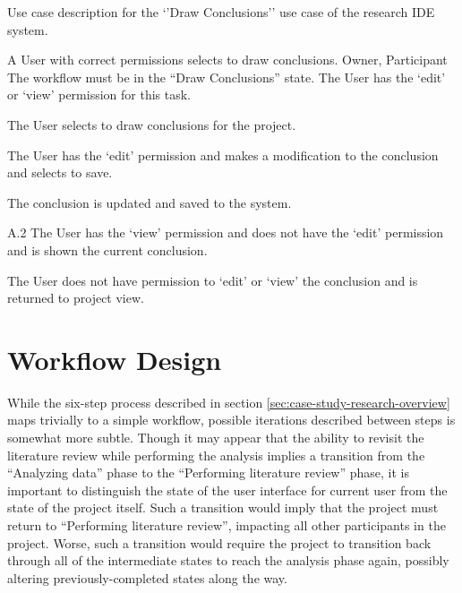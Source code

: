 \begin{table}
  \centering
  \caption{Use case description for the `'Draw Conclusions'' use case of the research IDE system.}
  \label{tbl:use-case-draw-conclusions}

  \begin{usecase}
    A User with correct permissions selects to draw conclusions.
    Owner, Participant
    The workflow must be in the “Draw Conclusions” state. The User has the ‘edit’ or ‘view’ permission for this task.
    \ucnormal
    \begin{ucenum}
      \item The User selects to draw conclusions for the project.
      \item The User has the ‘edit’ permission and makes a modification to the conclusion and selects to save.
      \item The conclusion is updated and saved to the system.
    \end{ucenum}
    \begin{ucenum}
      \item [A.2] The User has the ‘view’ permission and does not have the ‘edit’ permission and is shown the current conclusion.
    \end{ucenum}
    The User does not have permission to ‘edit’ or ‘view’ the conclusion and is returned to project view.
  \end{usecase}
\end{table}

\FloatBarrier

\section {Workflow Design}

While the six-step process described in section \ref{sec:case-study-research-overview} maps trivially to a simple workflow, possible iterations described between steps is somewhat more subtle. Though it may appear that the ability to revisit the literature review while performing the analysis implies a transition from the ``Analyzing data'' phase to the ``Performing literature review'' phase, it is important to distinguish the state of the user interface for current user from the state of the project itself. Such a transition would imply that the project must return to ``Performing literature review'', impacting all other participants in the project. Worse, such a transition would require the project to transition back through all of the intermediate states to reach the analysis phase again, possibly altering previously-completed states along the way.

